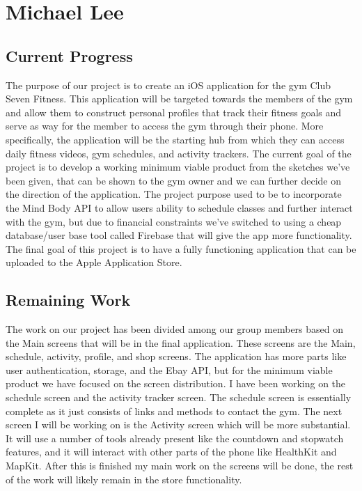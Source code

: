\documentclass[a4paper]{article}
\begin{document}
\section{Michael Lee}

\subsection{Current Progress}

The purpose of our project is to create an iOS application for the gym Club Seven Fitness. This application will be targeted towards the members of the gym and allow them to construct personal profiles that track their fitness goals and serve as way for the member to access the gym through their phone. More specifically, the application will be the starting hub from which they can access daily fitness videos, gym schedules, and activity trackers.  The current goal of the project is to develop a working minimum viable product from the sketches we’ve been given, that can be shown to the gym owner and we can further decide on the direction of the application. The project purpose used to be to incorporate the Mind Body API to allow users ability to schedule classes and further interact with the gym, but due to financial constraints we’ve switched to using a cheap database/user base tool called Firebase that will give the app more functionality. The final goal of this project is to have a fully functioning application that can be uploaded to the Apple Application Store.

\subsection{Remaining Work}

The work on our project has been divided among our group members based on the Main screens that will be in the final application. These screens are the Main, schedule, activity, profile, and shop screens. The application has more parts like user authentication, storage, and the Ebay API, but for the minimum viable product we have focused on the screen distribution. I have been working on the schedule screen and the activity tracker screen. The schedule screen is essentially complete as it just consists of links and methods to contact the gym. The next screen I will be working on is the Activity screen which will be more substantial. It will use a number of tools already present like the countdown and stopwatch features, and it will interact with other parts of the phone like HealthKit and MapKit. After this is finished my main work on the screens will be done, the rest of the work will likely remain in the store functionality.
\end{document}
